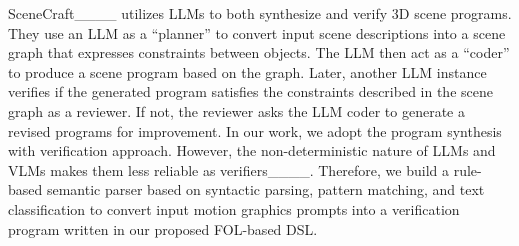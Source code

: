 SceneCraft____ utilizes LLMs to both synthesize and verify 3D scene programs.
They use an LLM as a ``planner'' to convert input scene descriptions into a scene graph that expresses constraints between objects.
The LLM then act as a ``coder'' to produce a scene program based on the graph.
Later, another LLM instance verifies if the generated program satisfies the constraints described in the scene graph as a reviewer.
If not, the reviewer asks the LLM coder to generate a revised programs for improvement.
%
In our work, we adopt the program synthesis with verification
approach. 
However, the non-deterministic nature of LLMs and VLMs makes them less reliable as verifiers____.
Therefore, we build a rule-based semantic parser based on syntactic parsing, pattern matching, and text classification to convert input motion graphics prompts into a verification program written in our proposed FOL-based DSL.




